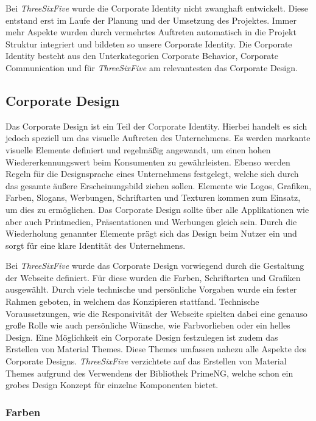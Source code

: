 Bei \textit{ThreeSixFive} wurde die Corporate Identity nicht zwanghaft entwickelt. Diese entstand erst im Laufe der Planung und der Umsetzung des Projektes. Immer mehr Aspekte wurden durch vermehrtes Auftreten automatisch in die Projekt Struktur integriert und bildeten so unsere Corporate Identity. Die Corporate Identity besteht aus den Unterkategorien Corporate Behavior, Corporate Communication und für \textit{ThreeSixFive} am relevantesten das Corporate Design.


\subsection{Corporate Design}

Das Corporate Design\cite{CorporateIdentity} ist ein Teil der Corporate Identity. Hierbei handelt es sich jedoch speziell um das visuelle Auftreten des Unternehmens. Es werden markante visuelle Elemente definiert und regelmäßig angewandt, um einen hohen Wiedererkennungswert beim Konsumenten zu gewährleisten. Ebenso werden Regeln für die Designsprache eines Unternehmens festgelegt, welche sich durch das gesamte äußere Erscheinungsbild ziehen sollen. Elemente wie Logos, Grafiken, Farben, Slogans, Werbungen, Schriftarten und Texturen kommen zum Einsatz, um dies zu ermöglichen. Das Corporate Design sollte über alle Applikationen wie aber auch Printmedien, Präsentationen und Werbungen gleich sein. Durch die Wiederholung genannter Elemente prägt sich das Design beim Nutzer ein und sorgt für eine klare Identität des Unternehmens.

Bei \textit{ThreeSixFive} wurde das Corporate Design vorwiegend durch die Gestaltung der Webseite definiert. Für diese wurden die Farben, Schriftarten und Grafiken ausgewählt. Durch viele technische und persönliche Vorgaben wurde ein fester Rahmen geboten, in welchem das Konzipieren stattfand. Technische Voraussetzungen, wie die Responsivität der Webseite spielten dabei eine genauso große Rolle wie auch persönliche Wünsche, wie Farbvorlieben oder ein helles Design. Eine Möglichkeit ein Corporate Design festzulegen ist zudem das Erstellen von Material Themes. Diese Themes umfassen nahezu alle Aspekte des Corporate Designs. \textit{ThreeSixFive} verzichtete auf das Erstellen von Material Themes aufgrund des Verwendens der Bibliothek PrimeNG, welche schon ein grobes Design Konzept für einzelne Komponenten bietet.

\subsubsection{Farben}

